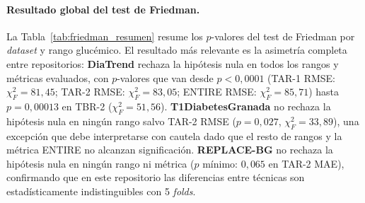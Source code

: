 \paragraph{Resultado global del test de Friedman.}
La Tabla~\ref{tab:friedman_resumen} resume los $p$-valores del test de
Friedman por \textit{dataset} y rango glucémico. El resultado más
relevante es la asimetría completa entre repositorios:
\textbf{DiaTrend} rechaza la hipótesis nula en todos los rangos y
métricas evaluados, con $p$-valores que van desde $p < 0{,}0001$
(TAR-1 RMSE: $\chi^2_F = 81{,}45$; TAR-2 RMSE: $\chi^2_F = 83{,}05$;
ENTIRE RMSE: $\chi^2_F = 85{,}71$) hasta $p = 0{,}00013$ en TBR-2
($\chi^2_F = 51{,}56$). \textbf{T1DiabetesGranada} no rechaza la
hipótesis nula en ningún rango salvo TAR-2 RMSE ($p = 0{,}027$,
$\chi^2_F = 33{,}89$), una excepción que debe interpretarse con cautela
dado que el resto de rangos y la métrica ENTIRE no alcanzan significación.
\textbf{REPLACE-BG} no rechaza la hipótesis nula en ningún rango ni
métrica ($p$ mínimo: $0{,}065$ en TAR-2 MAE), confirmando que en este
repositorio las diferencias entre técnicas son estadísticamente
indistinguibles con 5 \textit{folds}.

